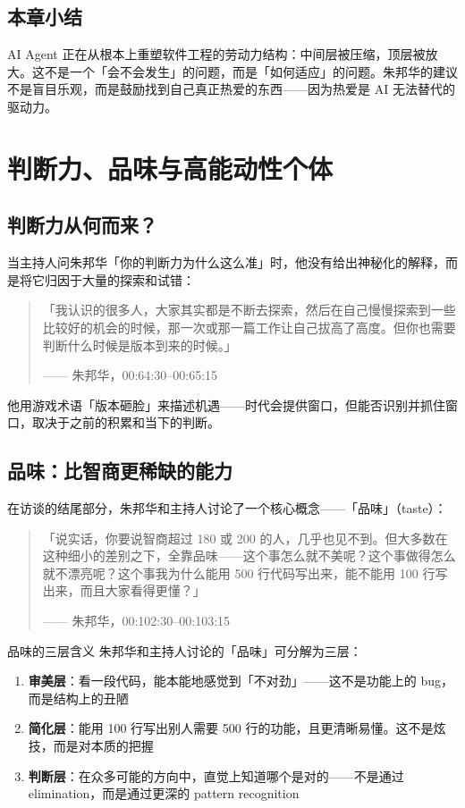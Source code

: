 \documentclass[a4paper]{article}
\begin{document}
\subsection{本章小结}
AI Agent 正在从根本上重塑软件工程的劳动力结构：中间层被压缩，顶层被放大。这不是一个「会不会发生」的问题，而是「如何适应」的问题。朱邦华的建议不是盲目乐观，而是鼓励找到自己真正热爱的东西——因为热爱是 AI 无法替代的驱动力。

\section{判断力、品味与高能动性个体}

\subsection{判断力从何而来？}

当主持人问朱邦华「你的判断力为什么这么准」时，他没有给出神秘化的解释，而是将它归因于大量的探索和试错：

\begin{quote}
「我认识的很多人，大家其实都是不断去探索，然后在自己慢慢探索到一些比较好的机会的时候，那一次或那一篇工作让自己拔高了高度。但你也需要判断什么时候是版本到来的时候。」\par
\hfill —— 朱邦华，00:64:30--00:65:15
\end{quote}

他用游戏术语「版本砸脸」来描述机遇——时代会提供窗口，但能否识别并抓住窗口，取决于之前的积累和当下的判断。

\subsection{品味：比智商更稀缺的能力}

在访谈的结尾部分，朱邦华和主持人讨论了一个核心概念——「品味」（taste）：

\begin{quote}
「说实话，你要说智商超过 180 或 200 的人，几乎也见不到。但大多数在这种细小的差别之下，全靠品味——这个事怎么就不美呢？这个事做得怎么就不漂亮呢？这个事我为什么能用 500 行代码写出来，能不能用 100 行写出来，而且大家看得更懂？」\par
\hfill —— 朱邦华，00:102:30--00:103:15
\end{quote}

\begin{importantbox}{品味的三层含义}
朱邦华和主持人讨论的「品味」可分解为三层：
\begin{enumerate}
\item \textbf{审美层}：看一段代码，能本能地感觉到「不对劲」——这不是功能上的 bug，而是结构上的丑陋
\item \textbf{简化层}：能用 100 行写出别人需要 500 行的功能，且更清晰易懂。这不是炫技，而是对本质的把握
\item \textbf{判断层}：在众多可能的方向中，直觉上知道哪个是对的——不是通过 elimination，而是通过更深的 pattern recognition
\end{enumerate}
\end{importantbox}
\end{document}
